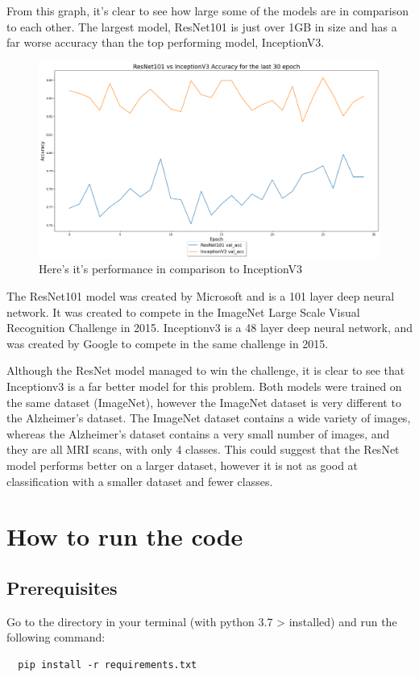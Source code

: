 \documentclass[]{final_report}
\begin{document}
From this graph, it's clear to see how large some of the models are in comparison to each other.
The largest model, ResNet101 is just over 1GB in size and has a far worse accuracy than the top performing model, InceptionV3.

\begin{figure}[ht!]
  \centering
  \includegraphics[width=120mm]{images/ResNet101-vs-Inceptionv3.png}
  \caption{Here's it's performance in comparison to InceptionV3}
\end{figure}

The ResNet101\cite{DBLP:journals/corr/HeZRS15} model was created by Microsoft and is a 101 layer deep neural network.
It was created to compete in the ImageNet Large Scale Visual Recognition Challenge\cite{ILSVRC} in 2015.
Inceptionv3 is a 48 layer deep neural network, and was created by Google to compete in the same challenge in 2015.

Although the ResNet model managed to win the challenge, it is clear to see that Inceptionv3 is a far better model for this problem.
Both models were trained on the same dataset (ImageNet), however the ImageNet dataset is very different to the Alzheimer's dataset.
The ImageNet dataset contains a wide variety of images, whereas the Alzheimer's dataset contains a very small number of images, and they are all MRI scans, with only 4 classes.
This could suggest that the ResNet model performs better on a larger dataset, however it is not as good at classification with a smaller dataset and fewer classes.

\chapter{How to run the code}

\section{Prerequisites}
Go to the directory in your terminal (with python 3.7 > installed) and run the following command:
\begin{lstlisting}
  pip install -r requirements.txt
\end{lstlisting}
\end{document}
